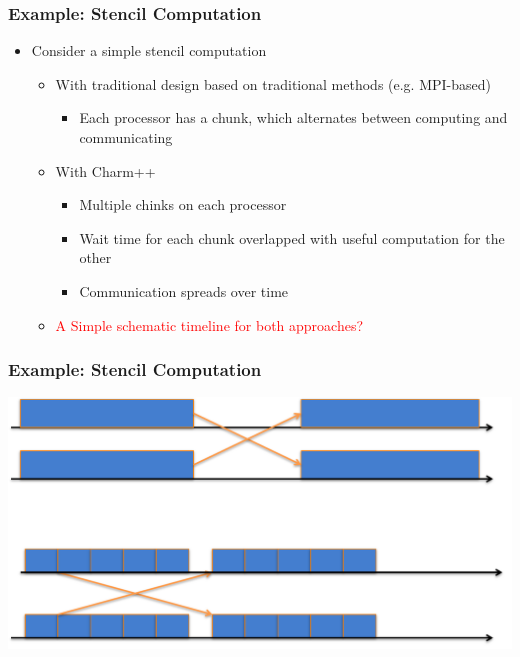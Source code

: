 \begin{frame}[t]
\frametitle{Example: Stencil Computation}
  \begin{itemize}
    \item Consider a simple stencil computation
    \begin{itemize}
      \item With traditional design based on traditional methods (e.g.  MPI-based)
      \begin{itemize}
        \item Each processor has a chunk, which alternates between computing and communicating
      \end{itemize}
      \item With Charm++
      \begin{itemize}
        \item Multiple chinks on each processor
        \item Wait time for each chunk overlapped with useful computation for the other
        \item Communication spreads over time
      \end{itemize}
      \item \textcolor{red}{A Simple schematic timeline for both approaches?}
    \end{itemize}
  \end{itemize}
\end{frame}

\begin{frame}[t]
\frametitle{Example: Stencil Computation}
  \begin{center} \includegraphics[width=\textwidth]{figures/stencil_timeline} \end{center}
\end{frame}

